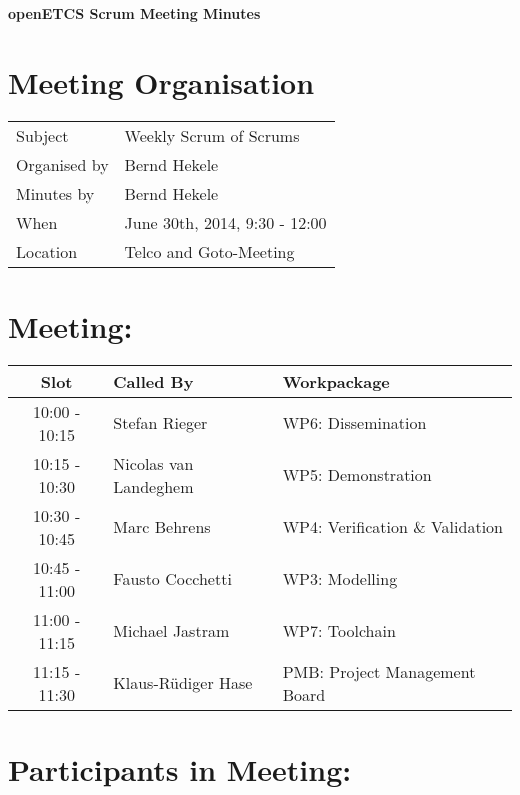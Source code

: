 \documentclass[a4paper, 11pt]{article}
\begin{document}
{\begin{center}\huge\bf openETCS Scrum Meeting Minutes\end{center}}
\section{Meeting Organisation}

\renewcommand{\arraystretch}{1.5}
\begin{supertabular}{m{.2\textwidth}m{.8\textwidth}}
Subject & Weekly Scrum of Scrums\\
Organised by & Bernd Hekele\\
Minutes by & Bernd Hekele\\
When & June 30th, 2014, 9:30 - 12:00\\
Location & Telco and Goto-Meeting\\
\end{supertabular}

\renewcommand{\arraystretch}{1.0}
\section{Meeting:}

\begin{tabular}{|c|l|l|}
\hline
\textbf{Slot} &  \textbf{Called By} & \textbf{Workpackage} \\
\hline  
10:00 - 10:15 & Stefan Rieger & WP6: Dissemination \\\hline  
10:15 - 10:30 & Nicolas van Landeghem & WP5: Demonstration \\\hline  
10:30 - 10:45 & Marc Behrens & WP4: Verification \& Validation \\\hline  
10:45 - 11:00 & Fausto Cocchetti & WP3: Modelling \\\hline  
11:00 - 11:15 & Michael Jastram & WP7: Toolchain \\\hline
11:15 - 11:30 & Klaus-R\"udiger Hase & PMB: Project Management Board \\\hline  
\end{tabular}

\section{Participants in Meeting:}
\end{document}
